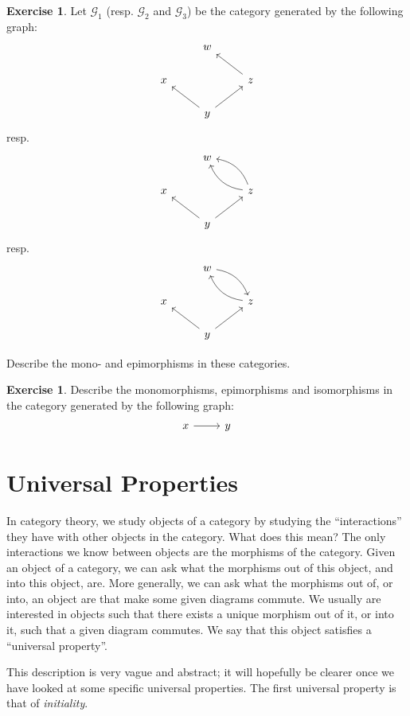 \documentclass[a4paper,11pt, oneside,titlepage=false]{scrbook}
\theoremstyle{plain}
\theoremstyle{definition}
\newtheorem{exer}[thm]{Exercise}
\begin{document}
\begin{exer} Let $\mathcal{G}_1$ (resp. $\mathcal{G}_2$ and $\mathcal{G}_3$) be the category generated by the following graph:
\[
\begin{tikzcd}
& w & \\
x & & z \arrow[lu] \\
& y \arrow[lu] \arrow[ru] &
\end{tikzcd}
\]
resp.
\[
\begin{tikzcd}
& w & \\
x & & z \arrow[lu, bend left] \arrow[lu,bend right] \\
& y \arrow[lu] \arrow[ru] &
\end{tikzcd}
\]
resp.
\[
\begin{tikzcd}
& w \arrow[rd,bend left] & \\
x & & z \arrow[lu, bend left] \\
& y \arrow[lu] \arrow[ru] &
\end{tikzcd}
\]

Describe the mono- and epimorphisms in these categories.
\end{exer}

\begin{exer} Describe the monomorphisms, epimorphisms and isomorphisms in the category generated by the following graph:
\[
\begin{tikzcd}
x \arrow[r] & y
\end{tikzcd}
\]
\end{exer}

\chapter{Universal Properties}\label{sec:universal}

In category theory, we study objects of a category by studying the ``interactions'' they have with other objects in the category.
What does this mean?
The only interactions we know between objects are the morphisms of the category.
Given an object of a category, we can ask what the morphisms out of this object, and into this object, are.
More generally, we can ask what the morphisms out of, or into, an object are that make some given diagrams commute.
We usually are interested in objects such that there exists a unique morphism out of it, or into it, such that a given diagram commutes.
We say that this object satisfies a ``universal property''.

This description is very vague and abstract; it will hopefully be clearer once we have looked at some specific universal properties.
The first universal property is that of \emph{initiality}.
\end{document}
